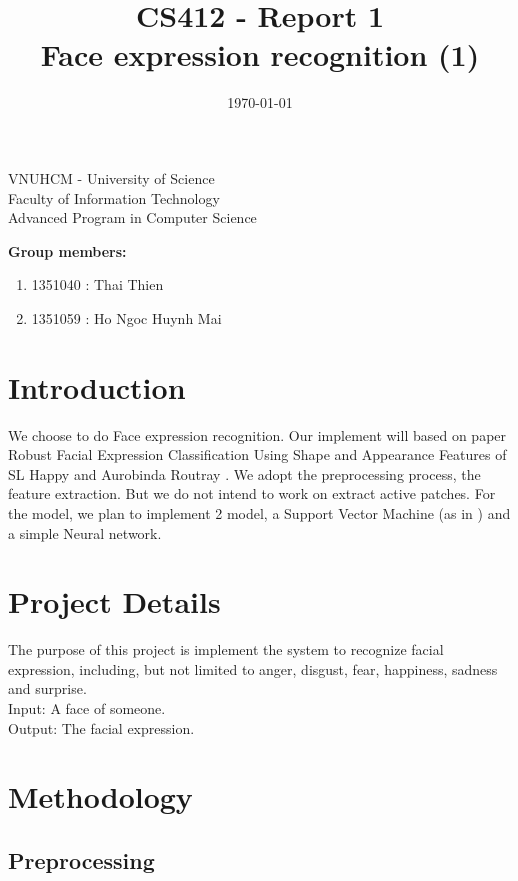 \documentclass[a4paper, 12pt]{article}
\title{CS412 - Report 1\\ Face expression recognition (1)}
\date{\today}
\begin{document}
\begin{center} 
\large VNUHCM - University of Science\\
Faculty of Information Technology\\
Advanced Program in Computer Science
\end{center}

\begingroup
\let\newpage\relax
\maketitle
\endgroup

\textbf{Group members:}
\begin{enumerate}
	\item 1351040 : Thai Thien
	\item 1351059 : Ho Ngoc Huynh Mai
\end{enumerate}

\section{Introduction}

We choose to do Face expression recognition. Our implement will based on paper Robust Facial Expression Classification Using Shape and Appearance Features of SL Happy and Aurobinda Routray \cite{7050661}. We adopt the preprocessing process, the feature extraction. But we do not intend to work on extract active patches. For the model, we plan to implement 2 model, a Support Vector Machine (as in \cite{7050661}) and a simple Neural network.      

\section{Project Details}
The purpose of this project is implement the system to recognize facial expression, including, but not limited to anger, disgust, fear, happiness, sadness and surprise. \\
Input: A face of someone. \\
Output: The facial expression. \\ 

\section{Methodology}

\subsection{Preprocessing}
\label{sec:preprocessing}
\end{document}
